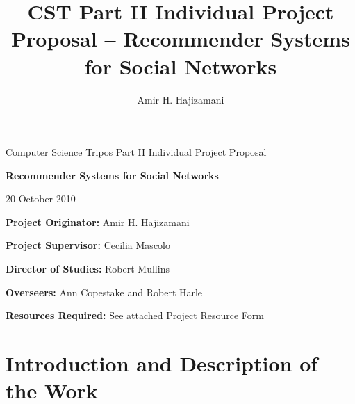 
\author{Amir H. Hajizamani}
\title{CST Part II Individual Project Proposal -- Recommender Systems for Social Networks}

\newcommand{\al}{$<$}
\newcommand{\ar}{$>$}

\parindent 0pt
\parskip 6pt

\thispagestyle{empty}

\medskip
{}
\medskip
{}

\vfill

\centerline{\large Computer Science Tripos Part II Individual Project Proposal}
\vspace{0.4in}
\centerline{\Large\bf Recommender Systems for Social Networks}
\vspace{0.3in}
\centerline{\large{20 October 2010}}

\vfill

{\bf Project Originator:} Amir H. Hajizamani

\vspace{0.2in}

{\bf Project Supervisor:} Cecilia Mascolo



\vspace{0.5in}

{\bf Director of Studies:} Robert Mullins

\vspace{0.2in}



{\bf Overseers:} Ann Copestake and Robert Harle



\vspace{0.5in}

{\bf Resources Required:} See attached Project Resource Form

\vfill
\eject


\section{Introduction and Description of the Work}

